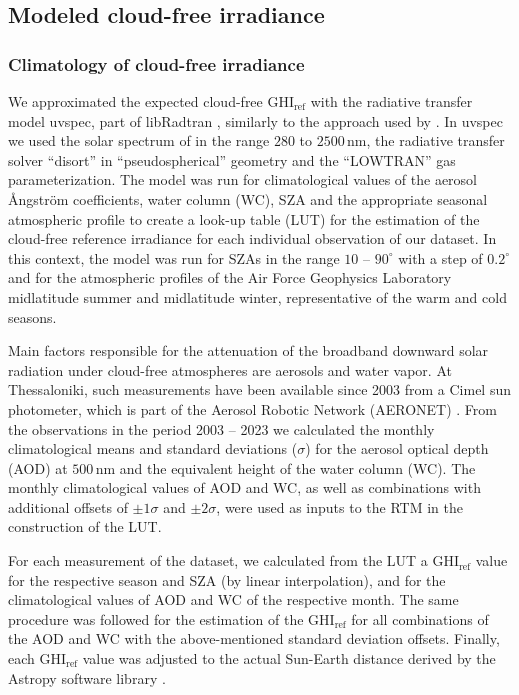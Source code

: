 \documentclass[preprint, 5p,
authoryear]{elsarticle} %
\begin{document}
\hypertarget{rtmcs}{%
\subsection{Modeled cloud-free irradiance}\label{rtmcs}}

\hypertarget{climatology-of-cloud-free-irradiance}{%
\subsubsection{Climatology of cloud-free
irradiance}\label{climatology-of-cloud-free-irradiance}}

We approximated the expected cloud-free \(\text{GHI}_\text{ref}\) with
the radiative transfer model uvspec, part of libRadtran
\citep{Emde2016}, similarly to the approach used by
\citet{Vamvakas2020}. In uvspec we used the solar spectrum of
\citet{Kurucz1994} in the range \(280\) to \(2500\,\text{nm}\), the
radiative transfer solver ``disort'' in ``pseudospherical'' geometry and
the ``LOWTRAN'' gas parameterization. The model was run for
climatological values of the aerosol Ångström coefficients, water column
(WC), SZA and the appropriate seasonal atmospheric profile to create a
look-up table (LUT) for the estimation of the cloud-free reference
irradiance for each individual observation of our dataset. In this
context, the model was run for SZAs in the range \(10\) -- \(90^\circ\)
with a step of \(0.2^\circ\) and for the atmospheric profiles of the Air
Force Geophysics Laboratory \citep{Anderson1986} midlatitude summer and
midlatitude winter, representative of the warm and cold seasons.

Main factors responsible for the attenuation of the broadband downward
solar radiation under cloud-free atmospheres are aerosols and water
vapor. At Thessaloniki, such measurements have been available since 2003
from a Cimel sun photometer, which is part of the Aerosol Robotic
Network (AERONET) \citep{Giles2019, Buis1998}. From the observations in
the period 2003 -- 2023 we calculated the monthly climatological means
and standard deviations (\(\sigma\)) for the aerosol optical depth (AOD)
at \(500\,\text{nm}\) and the equivalent height of the water column
(WC). The monthly climatological values of AOD and WC, as well as
combinations with additional offsets of \(\pm1\sigma\) and
\(\pm2\sigma\), were used as inputs to the RTM in the construction of
the LUT.

For each measurement of the dataset, we calculated from the LUT a
\(\text{GHI}_\text{ref}\) value for the respective season and SZA (by
linear interpolation), and for the climatological values of AOD and WC
of the respective month. The same procedure was followed for the
estimation of the \(\text{GHI}_\text{ref}\) for all combinations of the
AOD and WC with the above-mentioned standard deviation offsets. Finally,
each \(\text{GHI}_\text{ref}\) value was adjusted to the actual
Sun-Earth distance derived by the Astropy software library
\citep{AstropyCollaboration2022}.
\end{document}
